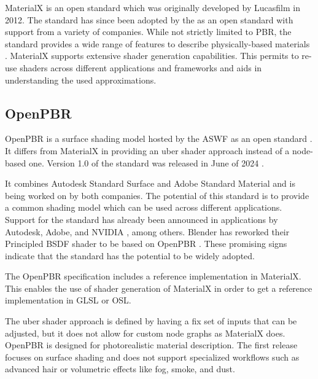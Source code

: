 \gls{MaterialX} is an open standard which was originally developed by Lucasfilm in 2012. The standard has since been adopted by the  as an open standard with support from a variety of companies. While not strictly limited to \gls{PBR}, the standard provides a wide range of features to describe physically-based materials \cite{Harrysson2019}. \gls{MaterialX} supports extensive shader generation capabilities. This permits to re-use shaders across different applications and frameworks and aids in understanding the used approximations.

\subsection*{OpenPBR}

\gls{OpenPBR} is a surface shading model hosted by the \gls{ASWF} as an open standard \cite{openPBRSpec}. It differs from \gls{MaterialX} in providing an \gls{uber shader} approach instead of a node-based one. Version 1.0 of the standard was released in June of 2024 \cite{openPBR1Dot0Release}.

It combines Autodesk Standard Surface and Adobe Standard Material and is being worked on by both companies. The potential of this standard is to provide a common shading model which can be used across different applications. Support for the standard has already been announced in applications by Autodesk, Adobe, and NVIDIA \cite{omniverseOpenPBR}, among others. \gls{Blender} has reworked their Principled \gls{BSDF} shader to be based on \gls{OpenPBR} \cite{blenderOpenPBRInspiration}. These promising signs indicate that the standard has the potential to be widely adopted.

The \gls{OpenPBR} specification includes a reference implementation in \gls{MaterialX}. This enables the use of shader generation of \gls{MaterialX} in order to get a reference implementation in \gls{GLSL} or \gls{OSL}.

The \gls{uber shader} approach is defined by having a fix set of inputs that can be adjusted, but it does not allow for custom node graphs as \gls{MaterialX} does. \gls{OpenPBR} is designed for photorealistic material description. The first release focuses on surface shading and does not support specialized workflows such as advanced hair or volumetric effects like fog, smoke, and dust.

